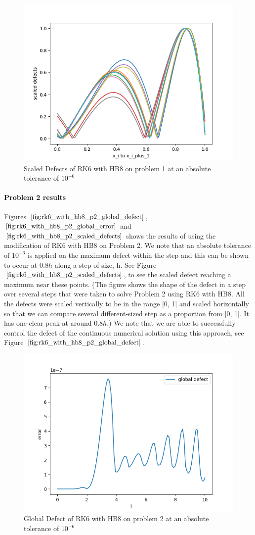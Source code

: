 \documentclass{article}
\begin{document}
\begin{figure}[H]
\centering
\includegraphics[width=0.7\linewidth]{./figures/rk6_with_hb8_p1_scaled_defects}
\caption{Scaled Defects of RK6 with HB8 on problem 1 at an absolute tolerance of $10^{-6}$}
\label{fig:rk6_with_hb8_p1_scaled_defects}
\end{figure}

\paragraph{Problem 2 results}
Figures $\ref{fig:rk6_with_hb8_p2_global_defect}$, $\ref{fig:rk6_with_hb8_p2_global_error}$ and $\ref{fig:rk6_with_hb8_p2_scaled_defects}$ shows the results of using the modification of RK6 with HB8 on Problem 2. We note that an absolute tolerance of $10^{-6}$ is applied on the maximum defect within the step and this can be shown to occur at $0.8h$ along a step of size, h. See Figure $\ref{fig:rk6_with_hb8_p2_scaled_defects}$, to see the scaled defect reaching a maximum near these points. (The figure shows the shape of the defect in a step over several steps that were taken to solve Problem 2 using RK6 with HB8. All the defects were scaled vertically to be in the range [0, 1] and scaled horizontally so that we can compare several different-sized step as a proportion from [0, 1]. It has one clear peak at around $0.8h$.) We note that we are able to successfully control the defect of the continuous numerical solution using this approach, see Figure $\ref{fig:rk6_with_hb8_p2_global_defect}$. 


\begin{figure}[H]
\centering
\includegraphics[width=0.7\linewidth]{./figures/rk6_with_hb8_p2_global_defect}
\caption{Global Defect of RK6 with HB8 on problem 2 at an absolute tolerance of $10^{-6}$}
\label{fig:rk6_with_hb8_p2_global_defect}
\end{figure}
\end{document}
